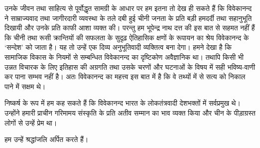 उनके जीवन तथा साहित्य से पूर्वोद्धृत सामग्री के आधार पर हम इतना तो देख ही सकते हैं कि विवेकानन्द ने साम्राज्यवाद तथा जागीरदारी व्यवस्था के तले दबी हुई चीनी जनता के प्रति बड़ी हमदर्दी तथा सहानुभूति दिखायी और उनके प्रति काफी आशा व्यक्त की। परन्तु हम भूपेन्द्र नाथ दत्त की इस बात से सहमत नहीं हैं कि चीनी तथा रूसी क्रान्तियों की सफलता के सुदृढ़ ऐतिहासिक क्षणों के रूपायन का श्रेय विवेकानन्द के ‘सन्देश’ को जाता है। यह तो उन्हें एक दिव्य अनुभूतिवादी व्यक्तित्व बना देगा। हमने देखा है कि सामाजिक विकास के नियमों से सम्बन्धित विवेकानन्द का दृष्टिकोण अवैज्ञानिक था। तथापि किसी भी उन्नत विचारक के लिए इतिहास की अग्रगति तथा उसके चरणों और घटनाओं के विषय में सही भविष्य-वाणी कर पाना सम्भव नहीं है। अतः विवेकानन्द का महत्त्व इस बात में है कि वे तथ्यों में से सत्य को निकाल पाने में सक्षम थे। 

निष्कर्ष के रूप में हम कह सकते हैं कि विवेकानन्द भारत के लोकतंत्रवादी देशभक्तों में सर्वप्रमुख थे। उन्होंने हमारी प्राचीन गरिमामय संस्कृति के प्रति अतीव सम्मान का भाव व्यक्त किया और चीन के पीड़ाग्रस्त लोगों से उन्हें प्रेम था। 

हम उन्हें श्रद्धांजलि अर्पित करते हैं। 

\delimiter



